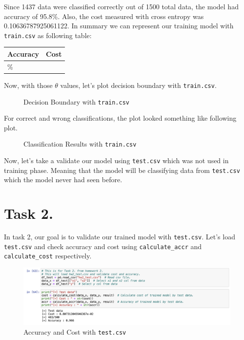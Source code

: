 \documentclass{homework}
\begin{document}
Since 1437 data were classified correctly out of 1500 total data, the model had accuracy of 95.8\%. Also, the cost measured with cross entropy was 0.10636787925061122. In summary we can represent our training model with \texttt{train.csv} as following table:

\begin{center}
\begin{tabularx}{0.8\textwidth} { 
  | >{\centering\arraybackslash}X 
  | >{\centering\arraybackslash}X | }
 \hline
 Accuracy & Cost \\
 \hline
 95.8\% & 0.10636787925061122\\
\hline
\end{tabularx}
\end{center}

Now, with those $\theta$ values, let's plot decision boundary with \texttt{train.csv}.

\begin{figure}[h]
    \begin{center}
        \resizebox{0.5\textwidth}{!}{}
    \end{center}
    \caption{Decision Boundary with \texttt{train.csv}}
\end{figure}

For correct and wrong classifications, the plot looked something like following plot.

\begin{figure}[h]
    \begin{center}
        \resizebox{0.5\textwidth}{!}{}
    \end{center}
    \caption{Classification Results with \texttt{train.csv}}
\end{figure}

Now, let's take a validate our model using \texttt{test.csv} which was not used in training phase. Meaning that the model will be classifying data from \texttt{test.csv} which the model never had seen before. 
\pagebreak

\section{Task 2.}
In task 2, our goal is to validate our trained model with \texttt{test.csv}. Let's load \texttt{test.csv} and check accuracy and cost using \texttt{calculate_accr} and \texttt{calculate_cost} respectively. 

\begin{figure}[h]
    \centering
    \includegraphics[width=15cm]{ml_2_3.png}
    \caption{Accuracy and Cost with \texttt{test.csv}}
    \label{fig:galaxy}
\end{figure}
\end{document}
